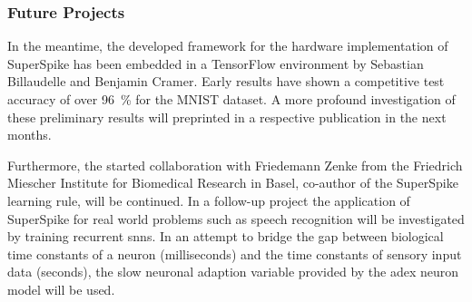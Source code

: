 \subsubsection*{Future Projects}
\label{futureprojects}
In the meantime, the developed framework for the hardware implementation of SuperSpike has been embedded in a TensorFlow environment by Sebastian Billaudelle and Benjamin Cramer. Early results have shown a competitive test accuracy of over \SI{96}{\%} for the MNIST dataset. A more profound investigation of these preliminary results will preprinted in a respective publication in the next months.

Furthermore, the started collaboration with Friedemann Zenke from the Friedrich Miescher Institute for Biomedical Research in Basel, co-author of the SuperSpike learning rule, will be continued. In a follow-up project the application of SuperSpike for real world problems such as speech recognition will be investigated by training recurrent \glspl{snn}. In an attempt to bridge the gap between biological time constants of a neuron (milliseconds) and the time constants of sensory input data (seconds), the slow neuronal adaption variable provided by the \gls{adex} neuron model will be used.